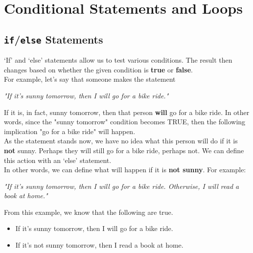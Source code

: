 \chapter{Conditional Statements and Loops}
\label{chp:conditional_statements_and_loops}	

\section{\texttt{if}/\texttt{else} Statements}
\label{sec:if_else_statements}


`If' and `else' statements allow us to test various conditions. The result then changes based on whether the given condition is \textbf{true} or \textbf{false}.\\

For example, let's say that someone makes the statement\\
\begin{center} \textit{"If it's sunny tomorrow, then I will go for a bike ride."} \end{center}

If it is, in fact, sunny tomorrow, then that person \textbf{will} go for a bike ride. In other words, since the "sunny tomorrow" condition becomes TRUE, then the following implication "go for a bike ride" will happen.\\

As the statement stands now, we have no idea what this person will do if it is \textbf{not} sunny. Perhaps they will still go for a bike ride, perhaps not. We can define this action with an `else' statement.\\

In other words, we can define what will happen if it is \textbf{not sunny}. For example:\\
\begin{center} \textit{"If it's sunny tomorrow, then I will go for a bike ride. Otherwise, I will read a book at home."} \end{center}

\noindent
From this example, we know that the following are true.
\begin{itemize}
	\item If it's sunny tomorrow, then I will go for a bike ride.
	\item If it's not sunny tomorrow, then I read a book at home.
\end{itemize}

